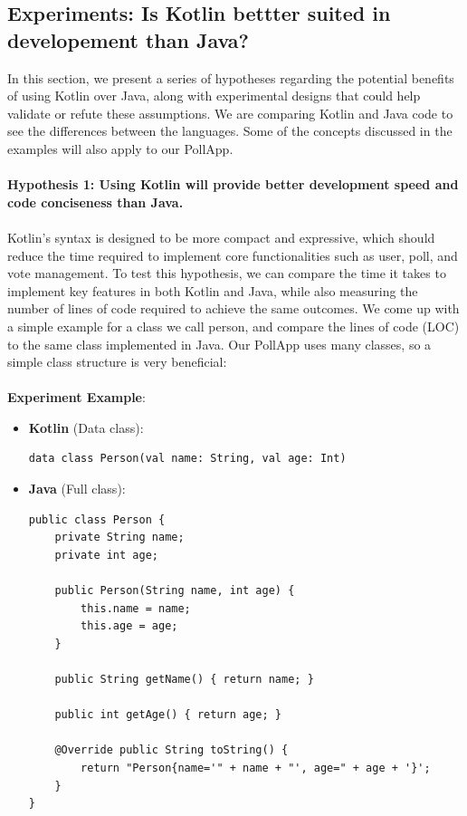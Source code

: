 \subsection{Experiments: Is Kotlin bettter suited in developement than Java? }

In this section, we present a series of hypotheses regarding the potential benefits of using Kotlin over Java, along with experimental designs that could help validate or refute these assumptions. We are comparing Kotlin and Java code to see the differences between the languages. Some of the concepts discussed in the examples will also apply to our PollApp. 
\\
\\
\textbf{Hypothesis 1: Using Kotlin will provide better development speed and code conciseness than Java.} 
\\
\\
Kotlin’s syntax is designed to be more compact and expressive, which should reduce the time required to implement core functionalities such as user, poll, and vote management. To test this hypothesis, we can compare the time it takes to implement key features in both Kotlin and Java, while also measuring the number of lines of code required to achieve the same outcomes. We come up with a simple example for a class we call person, and compare the lines of code (LOC) to the same class implemented in Java. Our PollApp uses many classes, so a simple class structure is very beneficial:
\\
\\
\textbf{Experiment Example}:
\begin{tcolorbox}[colframe=blue!80!black, colback=blue!5!white, coltitle=blue!50!black, title={-}]
    \begin{itemize}
	\vspace{0.5cm}
        \item \textbf{Kotlin} (Data class):
        \begin{lstlisting}[style=kotlin]
data class Person(val name: String, val age: Int)
        \end{lstlisting}
        
        \item \textbf{Java} (Full class):
        \begin{lstlisting}[style=java]
public class Person {
    private String name;
    private int age;

    public Person(String name, int age) {
        this.name = name;
        this.age = age;
    }

    public String getName() { return name; }

    public int getAge() { return age; }

    @Override public String toString() { 
        return "Person{name='" + name + "', age=" + age + '}'; 
    }
}
        \end{lstlisting}
    \end{itemize}
\end{tcolorbox}
\vspace{1cm}

